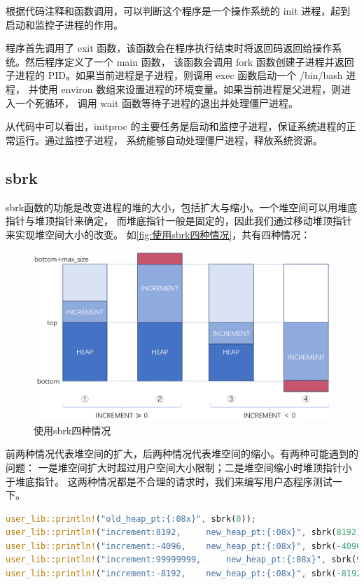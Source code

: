 根据代码注释和函数调用，可以判断这个程序是一个操作系统的 init 进程，起到启动和监控子进程的作用。

程序首先调用了 exit 函数，该函数会在程序执行结束时将返回码返回给操作系统。然后程序定义了一个 main 函数，
该函数会调用 fork 函数创建子进程并返回子进程的 PID。如果当前进程是子进程，则调用 exec 函数启动一个 /bin/bash 进程，
并使用 environ 数组来设置进程的环境变量。如果当前进程是父进程，则进入一个死循环，
调用 wait 函数等待子进程的退出并处理僵尸进程。

从代码中可以看出，initproc 的主要任务是启动和监控子进程，保证系统进程的正常运行。通过监控子进程，
系统能够自动处理僵尸进程，释放系统资源。


\subsection{sbrk}

sbrk函数的功能是改变进程的堆的大小，包括扩大与缩小。一个堆空间可以用堆底指针与堆顶指针来确定，
而堆底指针一般是固定的，因此我们通过移动堆顶指针来实现堆空间大小的改变。
如\autoref{fig:使用sbrk四种情况}，共有四种情况：

\begin{figure}[htb]
    \centering
    \includegraphics[width=\textwidth]{figures/03-01-使用sbrk四种情况.png}
    \caption{
        使用sbrk四种情况
    }
    \label{fig:使用sbrk四种情况}
\end{figure}

前两种情况代表堆空间的扩大，后两种情况代表堆空间的缩小。有两种可能遇到的问题：
一是堆空间扩大时超过用户空间大小限制；二是堆空间缩小时堆顶指针小于堆底指针。
这两种情况都是不合理的请求时，我们来编写用户态程序测试一下。

\begin{lstlisting}[language={Rust}, label={code:sbrk_test},
    caption={sbrk_test}]
user_lib::println!("old_heap_pt:{:08x}", sbrk(0));
user_lib::println!("increment:8192, 	new_heap_pt:{:08x}", sbrk(8192));
user_lib::println!("increment:-4096, 	new_heap_pt:{:08x}", sbrk(-4096));
user_lib::println!("increment:99999999, 	new_heap_pt:{:08x}", sbrk(99999999));
user_lib::println!("increment:-8192, 	new_heap_pt:{:08x}", sbrk(-8192));
\end{lstlisting}

